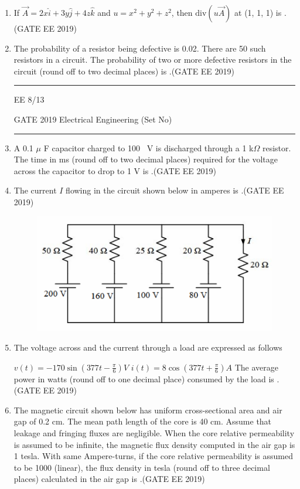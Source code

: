 \documentclass[a4paper,10pt]{exam}
\theoremstyle{remark}
\begin{document}
\begin{enumerate}
\begin{enumerate}[label=\arabic*.]
\item If $\vec{A} = 2x\hat{i} + 3y\hat{j} + 4z\hat{k}$ and $u = x^{2} + y^{2} + z^{2}$, then $\mathrm{div}(u\vec{A})$ at (1, 1, 1) is \underline{\hspace{2cm}}.\hfill{(GATE EE 2019)}

\item The probability of a resistor being defective is 0.02. There are 50 such resistors in a circuit. The probability of two or more defective resistors in the circuit (round off to two decimal places) is \underline{\hspace{3cm}}.\hfill{(GATE EE 2019)}
\vfill
\noindent\rule{\linewidth}{0.4pt}
EE \hfill 8/13
\newpage
\raggedright{GATE 2019 Electrical Engineering (Set No)}
\noindent\rule{\linewidth}{0.4pt}

\item A 0.1  $\mu$ F capacitor charged to 100 \, V is discharged through a 1 k$\Omega$ resistor. The time in ms (round off to two decimal places) required for the voltage across the capacitor to drop to 1 V is \underline{\hspace{2cm}}.\hfill{(GATE EE 2019)}

\item The current $I$ flowing in the circuit shown below in amperes is \underline{\hspace{2cm}}.\hfill{(GATE EE 2019)}

\begin{figure}[H]
    \centering
    \includegraphics[width=0.5\columnwidth]{figs/Q 42.png}\caption{}     \label{fig:placeholder}
\end{figure}

\item The voltage across and the current through a load are expressed as follows

$v(t) = -170 \sin\left(377 t - \frac{\pi}{6}\right) V$
$i(t) = 8 \cos\left(377 t + \frac{\pi}{6}\right) A$
The average power in watts (round off to one decimal place) consumed by the load is \underline{\hspace{2cm}}.\hfill{(GATE EE 2019)}


\item
The magnetic circuit shown below has uniform cross-sectional area and air gap of 0.2 cm. The mean path length of the core is 40 cm. Assume that leakage and fringing fluxes are negligible. When the core relative permeability is assumed to be infinite, the magnetic flux density computed in the air gap is 1 tesla. With same Ampere-turns, if the core relative permeability is assumed to be 1000 (linear), the flux density in tesla (round off to three decimal places) calculated in the air gap is \underline{\hspace{2cm}}.\hfill{(GATE EE 2019)}


\end{enumerate}
\end{enumerate}
\end{document}

